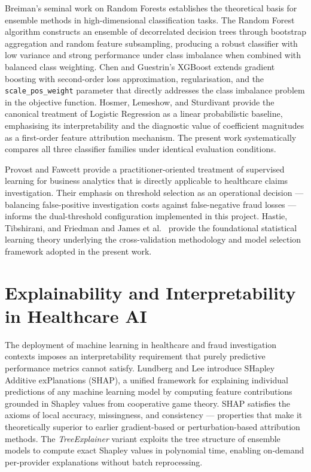 Breiman's seminal work on Random Forests \cite{b11} establishes the theoretical basis for ensemble methods in high-dimensional classification tasks. The Random Forest algorithm constructs an ensemble of decorrelated decision trees through bootstrap aggregation and random feature subsampling, producing a robust classifier with low variance and strong performance under class imbalance when combined with balanced class weighting. Chen and Guestrin's XGBoost \cite{b12} extends gradient boosting with second-order loss approximation, regularisation, and the \texttt{scale\_pos\_weight} parameter that directly addresses the class imbalance problem in the objective function. Hosmer, Lemeshow, and Sturdivant \cite{b13} provide the canonical treatment of Logistic Regression as a linear probabilistic baseline, emphasising its interpretability and the diagnostic value of coefficient magnitudes as a first-order feature attribution mechanism. The present work systematically compares all three classifier families under identical evaluation conditions.

Provost and Fawcett \cite{b18} provide a practitioner-oriented treatment of supervised learning for business analytics that is directly applicable to healthcare claims investigation. Their emphasis on threshold selection as an operational decision --- balancing false-positive investigation costs against false-negative fraud losses --- informs the dual-threshold configuration implemented in this project. Hastie, Tibshirani, and Friedman \cite{b20} and James et al.\ \cite{b21} provide the foundational statistical learning theory underlying the cross-validation methodology and model selection framework adopted in the present work.

\section{Explainability and Interpretability in Healthcare AI}
\label{sec:lit-xai}

The deployment of machine learning in healthcare and fraud investigation contexts imposes an interpretability requirement that purely predictive performance metrics cannot satisfy. Lundberg and Lee \cite{b6} introduce SHapley Additive exPlanations (SHAP), a unified framework for explaining individual predictions of any machine learning model by computing feature contributions grounded in Shapley values from cooperative game theory. SHAP satisfies the axioms of local accuracy, missingness, and consistency --- properties that make it theoretically superior to earlier gradient-based or perturbation-based attribution methods. The \textit{TreeExplainer} variant exploits the tree structure of ensemble models to compute exact Shapley values in polynomial time, enabling on-demand per-provider explanations without batch reprocessing.

